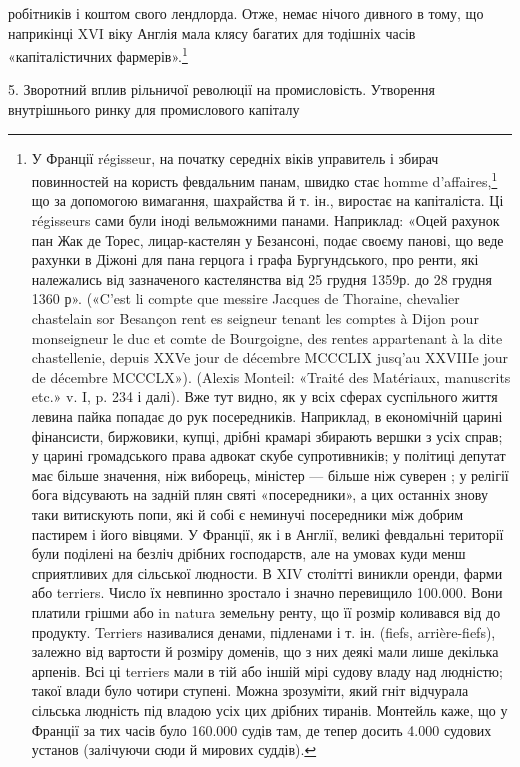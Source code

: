 робітників і коштом свого лендлорда. Отже, немає нічого дивного
в тому, що наприкінці XVI віку Англія мала клясу багатих
для тодішніх часів «капіталістичних фармерів».\footnote{
У Франції régisseur, на початку середніх віків управитель і збирач
повинностей на користь февдальним панам, швидко стає homme
d’affaires,\footnote*{
— ділком. \emph{Ред.}
} що за допомогою вимагання, шахрайства й т. ін., виростає
на капіталіста. Ці régisseurs сами були іноді вельможними панами. Наприклад:
«Оцей рахунок пан Жак де Торес, лицар-кастелян у
Безансоні, подає своєму панові, що веде рахунки в Діжоні для пана
герцога і графа Бургундського, про ренти, які належались від зазначеного
кастелянства від 25 грудня 1359р. до 28 грудня 1360 р». («C’est
li compte que messire Jacques de Thoraine, chevalier chastelain sor Besançon
rent es seigneur tenant les comptes à Dijon pour monseigneur le
duc et comte de Bourgoigne, des rentes appartenant à la dite chastellenie,
depuis XXVe jour de décembre MCCCLIX jusq’au XXVIIIe jour de décembre
MCCCLX»). (Alexis Monteil: «Traité des Matériaux, manuscrits etc.» v. I,
p. 234 і далі). Вже тут видно, як у всіх сферах суспільного життя левина
пайка попадає до рук посередників. Наприклад, в економічній царині фінансисти,
биржовики, купці, дрібні крамарі збирають вершки з усіх справ;
у царині громадського права адвокат скубе супротивників; у політиці
депутат має більше значення, ніж виборець, міністер — більше ніж суверен
; у релігії бога відсувають на задній плян святі «посередники», а цих
останніх знову таки витискують попи, які й собі є неминучі посередники
між добрим пастирем і його вівцями. У Франції, як і в Англії, великі
февдальні території були поділені на безліч дрібних господарств, але
на умовах куди менш сприятливих для сільської людности. В XIV столітті
виникли оренди, фарми або terriers. Число їх невпинно зростало і
значно перевищило 100.000. Вони платили грішми або in natura земельну
ренту, що її розмір коливався від  до  продукту. Terriers називалися
денами, підленами і т. ін. (fiefs, arrière-fiefs), залежно від вартости й
розміру доменів, що з них деякі мали лише декілька арпенів. Всі ці
terriers мали в тій або іншій мірі судову владу над людністю; такої влади
було чотири ступені. Можна зрозуміти, який гніт відчурала сільська
людність під владою усіх цих дрібних тиранів. Монтейль каже, що у Франції
за тих часів було 160.000 судів там, де тепер досить 4.000 судових установ
(залічуючи сюди й мирових суддів).
}

5. Зворотний вплив рільничої революції на промисловість.
Утворення внутрішнього ринку для промислового капіталу

